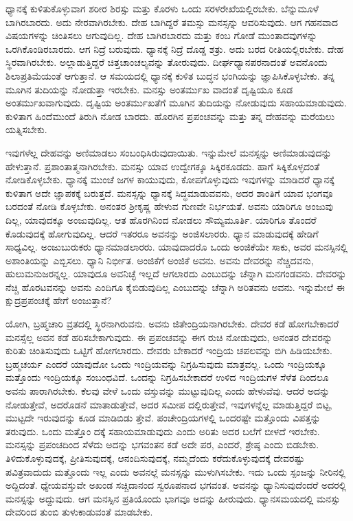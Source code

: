 ಧ್ಯಾನಕ್ಕೆ ಕುಳಿತುಕೊಳ್ಳುವಾಗ ಶರೀರ ಶಿರಸ್ಸು ಮತ್ತು ಕೊರಳು ಒಂದು ಸರಳರೇಖೆಯಲ್ಲಿರಬೇಕು. ಬೆನ್ನುಮೂಳೆ ಬಾಗಿರಬಾರದು. ಅದು ನೇರವಾಗಿರಬೇಕು. ದೇಹ ಬಾಗಿದ್ದರೆ ತಮಸ್ಸು ಮನಸ್ಸನ್ನು ಆವರಿಸುವುದು. ಆಗ ಗಹನವಾದ ವಿಷಯಗಳನ್ನು ಚಿಂತಿಸಲು ಆಗುವುದಿಲ್ಲ. ದೇಹ ಬಾಗಿರಬಾರದು ಮತ್ತು ಕಂಬ ಗೋಡೆ ಮುಂತಾದವುಗಳನ್ನು ಒರಗಿಕೊಂಡಿರಬಾರದು. ಆಗ ನಿದ್ರೆ ಬರುವುದು. ಧ್ಯಾನಕ್ಕೆ ನಿದ್ರೆ ದೊಡ್ಡ ಶತ್ರು. ಅದು ಬರದ ರೀತಿಯಲ್ಲಿರಬೇಕು. ದೇಹ ಸ್ಥಿರವಾಗಿರಬೇಕು. ಅಲ್ಲಾಡುತ್ತಿದ್ದರೆ ಚಿತ್ತಚಾಂಚಲ್ಯವನ್ನು ತೋರುವುದು. ದೀರ್ಘಧ್ಯಾನಪರನಾದಂತೆ ಅವನೊಂದು ಶಿಲಾಪ್ರತಿಮೆಯಂತೆ ಆಗುತ್ತಾನೆ. ಆ ಸಮಯದಲ್ಲಿ ಧ್ಯಾನಕ್ಕೆ ಕುಳಿತ ಬುದ್ಧನ ಭಂಗಿಯನ್ನು ಜ್ಞಾಪಿಸಿಕೊಳ್ಳಬೇಕು. ತನ್ನ ಮೂಗಿನ ತುದಿಯನ್ನು ನೋಡುತ್ತಾ ಇರಬೇಕು. ಮನಸ್ಸು ಅಂತರ್ಮುಖ ವಾದಂತೆ ದೃಷ್ಟಿಯೂ ಕೂಡ ಅಂತರ್ಮುಖವಾಗುವುದು. ದೃಷ್ಟಿಯ ಅಂತರ್ಮುಖತೆಗೆ ಮೂಗಿನ ತುದಿಯನ್ನು ನೋಡುವುದು ಸಹಾಯಮಾಡುವುದು. ಕುಳಿತಾಗ ಹಿಂದೆಮುಂದೆ ತಿರುಗಿ ನೋಡ ಬಾರದು. ಹೊರಗಿನ ಪ್ರಪಂಚವನ್ನು ಮತ್ತು ತನ್ನ ದೇಹವನ್ನು ಮರೆಯಲು ಯತ್ನಿಸಬೇಕು.

ಇವುಗಳೆಲ್ಲ ದೇಹವನ್ನು ಅಣಿಮಾಡಲು ಸಂಬಂಧಿಸಿರುವುದಾಯಿತು. ಇನ್ನುಮೇಲೆ ಮನಸ್ಸನ್ನು ಅಣಿಮಾಡುವುದನ್ನು ಹೇಳುತ್ತಾನೆ. ಪ್ರಶಾಂತಾತ್ಮನಾಗಿರಬೇಕು. ಮನಸ್ಸು ಯಾವ ಉದ್ವೇಗಕ್ಕೂ ಸಿಕ್ಕಿರಕೂಡದು. ಹಾಗೆ ಸಿಕ್ಕಿಕೊಳ್ಳದಂತೆ ನೋಡಿಕೊಳ್ಳಬೇಕು. ಧ್ಯಾನಕ್ಕೆ ಮುಂಚೆ ಜಗಳ ಕಾಯುವುದು, ಕೋಪಗೊಳ್ಳುವುದು ಇವುಗಳನ್ನು ಮಾಡಿದರೆ ಧ್ಯಾನಕ್ಕೆ ಕುಳಿತಾಗ ಅದೇ ಜ್ಞಾಪಕಕ್ಕೆ ಬರುತ್ತದೆ. ಮನಸ್ಸನ್ನು ಧ್ಯಾನಕ್ಕೆ ಸಿದ್ಧಮಾಡುವವನು, ಅದರ ಶಾಂತಿಗೆ ಯಾವ ಭಂಗವೂ ಬರದಂತೆ ನೋಡಿ ಕೊಳ್ಳಬೇಕು. ಅನಂತರ ಶ್ರೀಕೃಷ್ಣ ಹೇಳುವ ಗುಣವೇ ನಿರ್ಭಯತೆ. ಅವನು ಯಾರಿಗೂ ಅಂಜುವು ದಿಲ್ಲ, ಯಾವುದಕ್ಕೂ ಅಂಜುವುದಿಲ್ಲ. ಆತ ಹೊರಗಿನಿಂದ ನೋಡಲು ಸೌಮ್ಯಮೂರ್ತಿ. ಯಾರಿಗೂ ತೊಂದರೆ ಕೊಡುವುದಕ್ಕೆ ಹೋಗುವುದಿಲ್ಲ. ಆದರೆ ಇತರರೂ ಅವನನ್ನು ಅಂಜಿಸಲಾರರು. ಧ್ಯಾನ ಮಾಡುವುದಕ್ಕೆ ಹೇಡಿಗೆ ಸಾಧ್ಯವಿಲ್ಲ. ಅಂಜುಬುರುಕರು ಧ್ಯಾನಮಾಡಲಾರರು. ಯಾವುದಾದರೊ ಒಂದು ಅಂಜಿಕೆಯೇ ಸಾಕು, ಅವರ ಮನಸ್ಸಿನಲ್ಲಿ ಅಶಾಂತಿಯನ್ನು ಎಬ್ಬಿಸಲು. ಧ್ಯಾನಿ ನಿರ್ಭೀತ. ಅಂಜಿಕೆಗೆ ಅಂಜಿಕೆ ಅವನು. ಅವನು ದೇವರನ್ನು ನೆಚ್ಚಿದವನು, ಹುಲುಮನುಜರನ್ನಲ್ಲ. ಯಾವುದೂ ಅವನಿಚ್ಛೆ ಇಲ್ಲದೆ ಆಗಲಾರದು ಎಂಬುದನ್ನು ಚೆನ್ನಾಗಿ ಮನಗಂಡವನು. ದೇವರನ್ನು ನೆಚ್ಚಿ ಹೊರಟವನನ್ನು ಅವನು ಎಂದಿಗೂ ಕೈಬಿಡುವುದಿಲ್ಲ ಎಂಬುದನ್ನು ಚೆನ್ನಾಗಿ ಅರಿತವನು ಅವನು. ಇನ್ನುಮೇಲೆ ಈ ಕ್ಷುದ್ರಪ್ರಪಂಚಕ್ಕೆ ಹೇಗೆ ಅಂಜುತ್ತಾನೆ?

ಯೋಗಿ, ಬ್ರಹ್ಮಚಾರಿ ವ್ರತದಲ್ಲಿ ಸ್ಥಿರನಾಗಿರುವನು. ಅವನು ಜಿತೇಂದ್ರಿಯನಾಗಿರಬೇಕು. ದೇವರ ಕಡೆ ಹೋಗಬೇಕಾದರೆ ಮನಸ್ಸೆಲ್ಲ ಅವನ ಕಡೆ ಹರಿಸಬೇಕಾಗುವುದು. ಈ ಪ್ರಪಂಚವನ್ನು ಈಗ ರುಚಿ ನೋಡುವುದು, ಅನಂತರ ದೇವರನ್ನು ಕುರಿತು ಚಿಂತಿಸುವುದು ಒಟ್ಟಿಗೆ ಹೋಗಲಾರದು. ದೇವರು ಬೇಕಾದರೆ ಇಂದ್ರಿಯ ಚಪಲವನ್ನು ಬಿಗಿ ಹಿಡಿಯಬೇಕು. ಬ್ರಹ್ಮಚರ್ಯ ಎಂದರೆ ಯಾವುದೋ ಒಂದು ಇಂದ್ರಿಯವನ್ನು ನಿಗ್ರಹಿಸುವುದು ಮಾತ್ರವಲ್ಲ. ಒಂದು ಇಂದ್ರಿಯಕ್ಕೂ ಮತ್ತೊಂದು ಇಂದ್ರಿಯಕ್ಕೂ ಸಂಬಂಧವಿದೆ. ಒಂದನ್ನು ನಿಗ್ರಹಿಸಬೇಕಾದರೆ ಉಳಿದ ಇಂದ್ರಿಯಗಳ ಸೆಳೆತ ದಿಂದಲೂ ಅವನು ಪಾರಾಗಿರಬೇಕು. ಕೆಲವು ವೇಳೆ ಒಂದು ವಸ್ತುವನ್ನು ಮುಟ್ಟುವುದಿಲ್ಲ ಎಂದು ಹೇಳುವೆವು. ಆದರೆ ಅದನ್ನು ನೋಡುತ್ತೇವೆ, ಅದರೊಡನೆ ಮಾತಾಡುತ್ತೇವೆ, ಅದರ ಸಮೀಪ ದಲ್ಲಿರುತ್ತೇವೆ, ಇವುಗಳನ್ನೆಲ್ಲ ಮಾಡುತ್ತಿದ್ದರೆ ಬಿಟ್ಟ, ಮುಟ್ಟದೇ ಇರುವುದನ್ನು ಕೂಡ ಮಾಡಿಬಿಡು ತ್ತೇವೆ. ಪಂಚೇಂದ್ರಿಯಗಳಲ್ಲಿ ಒಂದರಷ್ಟೇ ಮತ್ತೊಂದು ವಿಪತ್ತನ್ನು ತರುವುದು. ಒಂದು ಮತ್ತೊಂ ದಕ್ಕೆ ಸಹಾಯಮಾಡುವುದು ಎಂದು ಅರಿತು ಅದರ ಬಲೆಗೆ ಬೀಳದೆ ಇರಬೇಕು. ಮನಸ್ಸನ್ನು ಪ್ರಪಂಚದಿಂದ ಸೆಳೆದು ಅದನ್ನು ಭಗವಂತನ ಕಡೆ ಅದೇ ಪರ, ಎಂದರೆ, ಶ್ರೇಷ್ಠ ಎಂದು ಬಿಡಬೇಕು. ತಿಳಿದುಕೊಳ್ಳುವುದಕ್ಕೆ, ಪ್ರೀತಿಸುವುದಕ್ಕೆ, ಆನಂದಿಸುವುದಕ್ಕೆ, ನಮ್ಮದೆಂದು ಕರೆದುಕೊಳ್ಳುವುದಕ್ಕೆ ದೇವರಷ್ಟು ಪವಿತ್ರವಾದುದು ಮತ್ತೊಂದು ಇಲ್ಲ ಎಂದು ಅವನಲ್ಲೆ ಮನಸ್ಸನ್ನು ಮುಳುಗಿಸಬೇಕು. ಇದು ಒಂದು ಸ್ಪಂಜನ್ನು ನೀರಿನಲ್ಲಿ ಅದ್ದಿದಂತೆ. ಧ್ಯೇಯವಸ್ತುವೇ ಅಖಂಡ ಸಚ್ಚಿದಾನಂದ ಸ್ವರೂಪನಾದ ಭಗವಂತ. ಅವನನ್ನು ಧ್ಯಾನಿಸುವುದೆಂದರೆ ಅದರಲ್ಲಿ ಮನಸ್ಸನ್ನು ಅದ್ದುವುದು. ಆಗ ಮನಸ್ಸಿನ ಪ್ರತಿಯೊಂದು ಭಾಗವೂ ಅದನ್ನು ಹೀರುವುದು. ಧ್ಯಾನಸಮಯದಲ್ಲಿ ಮನಸ್ಸು ದೇವರಿಂದ ತುಂಬಿ ತುಳುಕಾಡುವಂತೆ ಮಾಡಬೇಕು.

